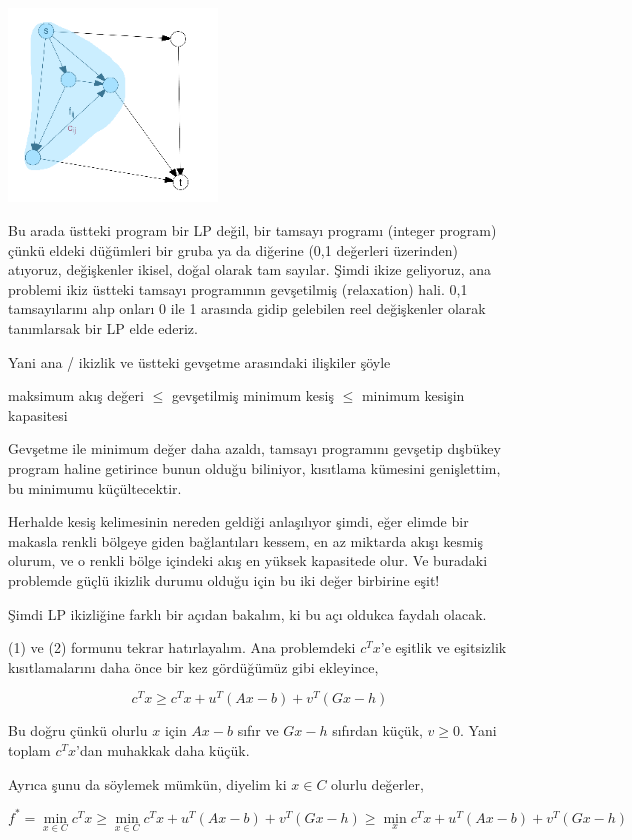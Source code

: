 \documentclass[12pt,fleqn]{article}\usepackage{../../common}
\begin{document}
\includegraphics[width=15em]{func_55_duality_03.png}

Bu arada üstteki program bir LP değil, bir tamsayı programı (integer
program) çünkü eldeki düğümleri bir gruba ya da diğerine (0,1 değerleri
üzerinden) atıyoruz, değişkenler ikisel, doğal olarak tam sayılar. Şimdi
ikize geliyoruz, ana problemi ikiz üstteki tamsayı programının gevşetilmiş
(relaxation) hali. 0,1 tamsayılarını alıp onları 0 ile 1 arasında gidip
gelebilen reel değişkenler olarak tanımlarsak bir LP elde ederiz. 

Yani ana / ikizlik ve üstteki gevşetme arasındaki ilişkiler şöyle

maksimum akış değeri $\le$ 
gevşetilmiş minimum kesiş $\le$ 
minimum kesişin kapasitesi

Gevşetme ile minimum değer daha azaldı, tamsayı programını gevşetip
dışbükey program haline getirince bunun olduğu biliniyor, kısıtlama
kümesini genişlettim, bu minimumu küçültecektir. 

Herhalde kesiş kelimesinin nereden geldiği anlaşılıyor şimdi, eğer elimde
bir makasla renkli bölgeye giden bağlantıları kessem, en az miktarda akışı
kesmiş olurum, ve o renkli bölge içindeki akış en yüksek kapasitede olur.
Ve buradaki problemde güçlü ikizlik durumu olduğu için bu iki değer
birbirine eşit! 

Şimdi LP ikizliğine farklı bir açıdan bakalım, ki bu açı oldukca faydalı
olacak. 

(1) ve (2) formunu tekrar hatırlayalım. Ana problemdeki $c^Tx$'e eşitlik ve
eşitsizlik  kısıtlamalarını daha önce bir kez gördüğümüz gibi ekleyince,

$$
c^T x \ge c^T x + u^T (Ax-b) + v^T (Gx-h)
$$

Bu doğru çünkü olurlu $x$ için $Ax-b$ sıfır ve $Gx-h$ sıfırdan küçük,
$v \ge 0$. Yani toplam $c^T x$'dan muhakkak daha küçük. 

Ayrıca şunu da söylemek mümkün, diyelim ki $x \in C$ olurlu değerler, 

$$
f^\ast = \min_{x \in C} c^T x \ge 
\min_{x \in C} c^T x + u^T (Ax-b) + v^T (Gx-h) \ge
\min_x c^T x + u^T (Ax-b) + v^T (Gx-h)
$$
\end{document}

